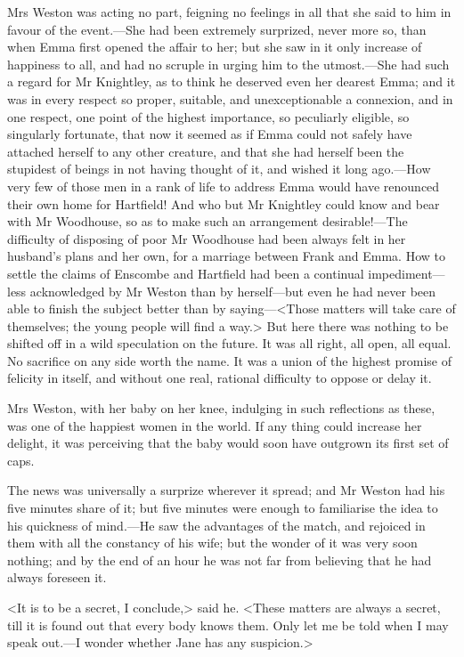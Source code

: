 Mrs Weston was acting no part, feigning no feelings in all that she said to him in favour of the event.—She had been extremely surprized, never more so, than when Emma first opened the affair to her; but she saw in it only increase of happiness to all, and had no scruple in urging him to the utmost.—She had such a regard for Mr Knightley, as to think he deserved even her dearest Emma; and it was in every respect so proper, suitable, and unexceptionable a connexion, and in one respect, one point of the highest importance, so peculiarly eligible, so singularly fortunate, that now it seemed as if Emma could not safely have attached herself to any other creature, and that she had herself been the stupidest of beings in not having thought of it, and wished it long ago.—How very few of those men in a rank of life to address Emma would have renounced their own home for Hartfield! And who but Mr Knightley could know and bear with Mr Woodhouse, so as to make such an arrangement desirable!—The difficulty of disposing of poor Mr Woodhouse had been always felt in her husband's plans and her own, for a marriage between Frank and Emma. How to settle the claims of Enscombe and Hartfield had been a continual impediment—less acknowledged by Mr Weston than by herself—but even he had never been able to finish the subject better than by saying—<Those matters will take care of themselves; the young people will find a way.> But here there was nothing to be shifted off in a wild speculation on the future. It was all right, all open, all equal. No sacrifice on any side worth the name. It was a union of the highest promise of felicity in itself, and without one real, rational difficulty to oppose or delay it.

Mrs Weston, with her baby on her knee, indulging in such reflections as these, was one of the happiest women in the world. If any thing could increase her delight, it was perceiving that the baby would soon have outgrown its first set of caps.

The news was universally a surprize wherever it spread; and Mr Weston had his five minutes share of it; but five minutes were enough to familiarise the idea to his quickness of mind.—He saw the advantages of the match, and rejoiced in them with all the constancy of his wife; but the wonder of it was very soon nothing; and by the end of an hour he was not far from believing that he had always foreseen it.

<It is to be a secret, I conclude,> said he. <These matters are always a secret, till it is found out that every body knows them. Only let me be told when I may speak out.—I wonder whether Jane has any suspicion.>


